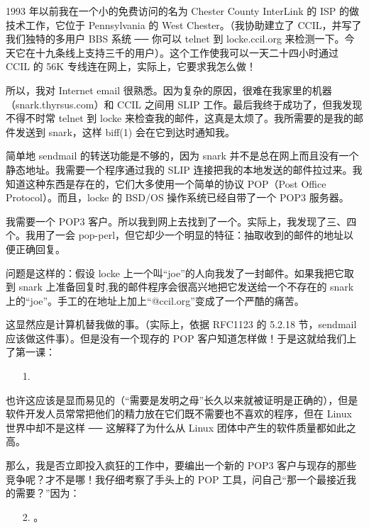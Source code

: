 1993 年以前我在一个小的免费访问的名为 Chester County InterLink 的 ISP 的做技术工作，它位于 Pennsylvania 的 West Chester。（我协助建立了 CCIL，并写了我们独特的多用户 BBS 系统 ── 你可以 telnet 到 locke.ccil.org 来检测一下。今天它在十九条线上支持三千的用户）。这个工作使我可以一天二十四小时通过 CCIL 的 56K 专线连在网上，实际上，它要求我怎么做！


所以，我对 Internet email 很熟悉。因为复杂的原因，很难在我家里的机器（snark.thyrsus.com）和 CCIL 之间用 SLIP 工作。最后我终于成功了，但我发现不得不时常 telnet 到 locke 来检查我的邮件，这真是太烦了。我所需要的是我的邮件发送到 snark，这样 biff(1) 会在它到达时通知我。


简单地 sendmail 的转送功能是不够的，因为 snark 并不是总在网上而且没有一个静态地址。我需要一个程序通过我的 SLIP 连接把我的本地发送的邮件拉过来。我知道这种东西是存在的，它们大多使用一个简单的协议 POP（Post Office Protocol）。而且，locke 的 BSD/OS 操作系统已经自带了一个 POP3 服务器。


我需要一个 POP3 客户。所以我到网上去找到了一个。实际上，我发现了三、四个。我用了一会 pop-perl，但它却少一个明显的特征：抽取收到的邮件的地址以便正确回复。


问题是这样的：假设 locke 上一个叫“joe”的人向我发了一封邮件。如果我把它取到 snark 上准备回复时,我的邮件程序会很高兴地把它发送给一个不存在的 snark 上的“joe”。手工的在地址上加上“@ccil.org”变成了一个严酷的痛苦。


这显然应是计算机替我做的事。（实际上，依据 RFC1123 的 5.2.18 节，sendmail 应该做这件事）。但是没有一个现存的 POP 客户知道怎样做！于是这就给我们上了第一课：


\begin{enumerate}
\item[1.] 
\end{enumerate}

也许这应该是显而易见的（“需要是发明之母”长久以来就被证明是正确的），但是软件开发人员常常把他们的精力放在它们既不需要也不喜欢的程序，但在 Linux 世界中却不是这样 ── 这解释了为什么从 Linux 团体中产生的软件质量都如此之高。


那么，我是否立即投入疯狂的工作中，要编出一个新的 POP3 客户与现存的那些竞争呢？才不是哪！我仔细考察了手头上的 POP 工具，问自己“那一个最接近我的需要？”因为：

\begin{enumerate}
\item[2.] 。
\end{enumerate}



